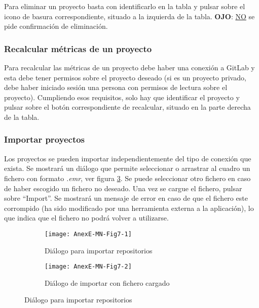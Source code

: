 Para eliminar un proyecto basta con identificarlo en la tabla y pulsar sobre el icono de basura correspondiente, situado a la izquierda de la tabla. \textbf{OJO}: \underline{NO} se pide confirmación de eliminación.

\subsubsection{Recalcular métricas de un proyecto}

Para recalcular las métricas de un proyecto debe haber una conexión a GitLab y esta debe tener permisos sobre el proyecto deseado (si es un proyecto privado, debe haber iniciado sesión una persona con permisos de lectura sobre el proyecto). Cumpliendo esos requisitos, solo hay que identificar el proyecto y pulsar sobre el botón correspondiente de recalcular, situado en la parte derecha de la tabla.

\subsubsection{Importar proyectos}
Los proyectos se pueden importar independientemente del tipo de conexión que exista. Se mostrará un diálogo que permite seleccionar o arrastrar al cuadro un fichero con formato \textit{.emr}, ver figura \ref{fig:AnexE-MN-Fig7}. Se puede seleccionar otro fichero en caso de haber escogido un fichero no deseado. Una vez se cargue el fichero, pulsar sobre ``Import''. Se mostrará un mensaje de error en caso de que el fichero este corrompido (ha sido modificado por una herramienta externa a la aplicación), lo que indica que el fichero no podrá volver a utilizarse.
\begin{figure}[!h]
	\centering
	\begin{subfigure}{.45\textwidth}
		\centering
		\texttt{[image: AnexE-MN-Fig7-1]}
		\caption{Diálogo para importar repositorios}
		\label{fig:AnexE-MN-Fig7-1}
	\end{subfigure}\hfill
	\begin{subfigure}{.45\textwidth}
		\centering
		\texttt{[image: AnexE-MN-Fig7-2]}
		\caption{Diálogo de importar con fichero cargado}
		\label{fig:AnexE-MN-Fig7-2}
	\end{subfigure}
	\caption{Diálogo para importar repositorios}
	\label{fig:AnexE-MN-Fig7}
\end{figure}

